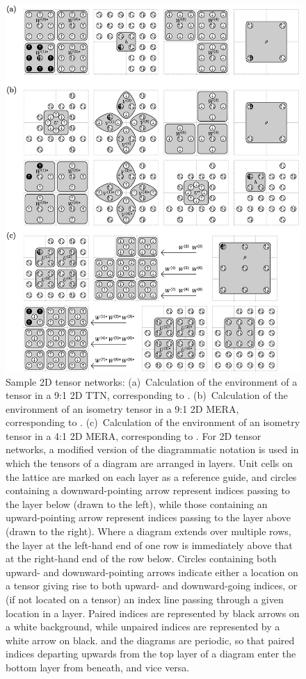 \documentclass[aps,pre,reprint,superscriptaddress,amsfonts,amsmath,showpacs,nofootinbib,floatfix]{revtex4-1}
\newcommand{\pEref}[1]{\protect{Eq.~(\ref{#1})}}
\begin{document}
\begin{figure}
\includegraphics[width=492.0pt]{2DTNs}
\caption{Sample 2D tensor networks: 
(a)~Calculation of the environment of a tensor in a 9:1 2D TTN, corresponding to \pEref{eq:2DTTN}. %
(b)~Calculation of the environment of an isometry tensor in a 9:1 2D MERA, corresponding to \pEref{eq:2DTN1}. %
(c)~Calculation of the environment of an isometry tensor in a 4:1 2D MERA, corresponding to \pEref{eq:2DTN2}. %
For 2D tensor networks, a modified version of the diagrammatic notation is used in which the tensors of a diagram are arranged in layers. Unit cells on the lattice are marked on each layer as a reference guide, and circles containing a downward-pointing arrow represent indices passing to the layer below (drawn to the left), while those containing an upward-pointing arrow represent indices passing to the layer above (drawn to the right). Where a diagram extends over multiple rows, the layer at the left-hand end of one row is immediately above that at the right-hand end of the row below.
Circles containing both upward- and downward-pointing arrows indicate either a location on a tensor giving rise to both upward- and downward-going indices, or (if not located on a tensor) an index line passing through a given location in a layer. Paired indices are represented by black arrows on a white background, while unpaired indices are represented by a white arrow on black. and the diagrams are periodic, so that paired indices departing upwards from the top layer of a diagram enter the bottom layer from beneath, and vice versa.
\label{fig:2DTNs}}
\end{figure}%
\end{document}
